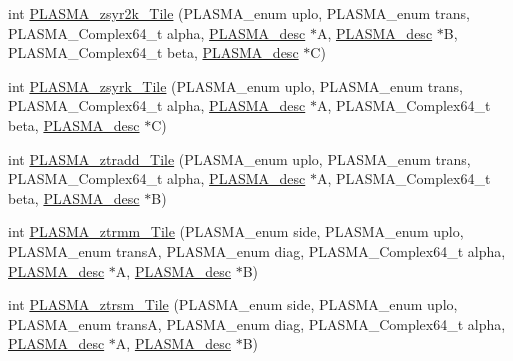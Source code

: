 \begin{DoxyCompactItemize}
\item 
int \hyperlink{group__PLASMA__Complex64__t__Tile_ga84266642d3b1d97fafcfc81d695cc3d5_ga84266642d3b1d97fafcfc81d695cc3d5}{P\+L\+A\+S\+M\+A\+\_\+zsyr2k\+\_\+\+Tile} (P\+L\+A\+S\+M\+A\+\_\+enum uplo, P\+L\+A\+S\+M\+A\+\_\+enum trans, P\+L\+A\+S\+M\+A\+\_\+\+Complex64\+\_\+t alpha, \hyperlink{structplasma__desc__t}{P\+L\+A\+S\+M\+A\+\_\+desc} $\ast$A, \hyperlink{structplasma__desc__t}{P\+L\+A\+S\+M\+A\+\_\+desc} $\ast$B, P\+L\+A\+S\+M\+A\+\_\+\+Complex64\+\_\+t beta, \hyperlink{structplasma__desc__t}{P\+L\+A\+S\+M\+A\+\_\+desc} $\ast$C)
\item 
int \hyperlink{group__PLASMA__Complex64__t__Tile_ga562df1ff0cbc44d96feff13cb26cd8ec_ga562df1ff0cbc44d96feff13cb26cd8ec}{P\+L\+A\+S\+M\+A\+\_\+zsyrk\+\_\+\+Tile} (P\+L\+A\+S\+M\+A\+\_\+enum uplo, P\+L\+A\+S\+M\+A\+\_\+enum trans, P\+L\+A\+S\+M\+A\+\_\+\+Complex64\+\_\+t alpha, \hyperlink{structplasma__desc__t}{P\+L\+A\+S\+M\+A\+\_\+desc} $\ast$A, P\+L\+A\+S\+M\+A\+\_\+\+Complex64\+\_\+t beta, \hyperlink{structplasma__desc__t}{P\+L\+A\+S\+M\+A\+\_\+desc} $\ast$C)
\item 
int \hyperlink{group__PLASMA__Complex64__t__Tile_gaf4b212c0d494896adba363870af8e6f0_gaf4b212c0d494896adba363870af8e6f0}{P\+L\+A\+S\+M\+A\+\_\+ztradd\+\_\+\+Tile} (P\+L\+A\+S\+M\+A\+\_\+enum uplo, P\+L\+A\+S\+M\+A\+\_\+enum trans, P\+L\+A\+S\+M\+A\+\_\+\+Complex64\+\_\+t alpha, \hyperlink{structplasma__desc__t}{P\+L\+A\+S\+M\+A\+\_\+desc} $\ast$A, P\+L\+A\+S\+M\+A\+\_\+\+Complex64\+\_\+t beta, \hyperlink{structplasma__desc__t}{P\+L\+A\+S\+M\+A\+\_\+desc} $\ast$B)
\item 
int \hyperlink{group__PLASMA__Complex64__t__Tile_ga4ecbc28dd8c924fff262c73b5662eba7_ga4ecbc28dd8c924fff262c73b5662eba7}{P\+L\+A\+S\+M\+A\+\_\+ztrmm\+\_\+\+Tile} (P\+L\+A\+S\+M\+A\+\_\+enum side, P\+L\+A\+S\+M\+A\+\_\+enum uplo, P\+L\+A\+S\+M\+A\+\_\+enum trans\+A, P\+L\+A\+S\+M\+A\+\_\+enum diag, P\+L\+A\+S\+M\+A\+\_\+\+Complex64\+\_\+t alpha, \hyperlink{structplasma__desc__t}{P\+L\+A\+S\+M\+A\+\_\+desc} $\ast$A, \hyperlink{structplasma__desc__t}{P\+L\+A\+S\+M\+A\+\_\+desc} $\ast$B)
\item 
int \hyperlink{group__PLASMA__Complex64__t__Tile_gaa30141c5d48339be52806a6d01a6de1d_gaa30141c5d48339be52806a6d01a6de1d}{P\+L\+A\+S\+M\+A\+\_\+ztrsm\+\_\+\+Tile} (P\+L\+A\+S\+M\+A\+\_\+enum side, P\+L\+A\+S\+M\+A\+\_\+enum uplo, P\+L\+A\+S\+M\+A\+\_\+enum trans\+A, P\+L\+A\+S\+M\+A\+\_\+enum diag, P\+L\+A\+S\+M\+A\+\_\+\+Complex64\+\_\+t alpha, \hyperlink{structplasma__desc__t}{P\+L\+A\+S\+M\+A\+\_\+desc} $\ast$A, \hyperlink{structplasma__desc__t}{P\+L\+A\+S\+M\+A\+\_\+desc} $\ast$B)

\end{DoxyCompactItemize}
